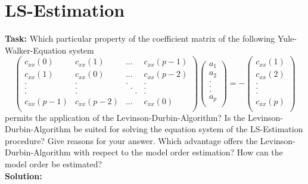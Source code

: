\section{LS-Estimation}
\noindent \textbf{Task:} Which particular property of the coefficient matrix of the following Yule-Walker-Equation system
\begin{equation*}
\begin{pmatrix}
c_{xx}(0) & c_{xx}(1) & ... & c_{xx}(p-1)\\
c_{xx}(1) & c_{xx}(0) & ... & c_{xx}(p-2)\\
. & . &.  &. \\
. & . &\;\;.  &. \\
. & . &\; \; \; \; .  &. \\
c_{xx}(p-1) & c_{xx}(p-2) & ... & c_{xx}(0)\\
\end{pmatrix}
\begin{pmatrix}
a_1\\
a_2\\
. \\
. \\
. \\
a_p \\
\end{pmatrix} = -
\begin{pmatrix}
c_{xx}(1)\\
c_{xx}(2)\\
. \\
. \\
. \\
c_{xx}(p)\\
\end{pmatrix}
\end{equation*}
permits the application of the Levinson-Durbin-Algorithm? Is the Levinson-Durbin-Algorithm be suited for solving the equation system of the LS-Estimation procedure? Give reasons for your answer. Which advantage offers the Levinson-Durbin-Algorithm with respect to the model order estimation? How can the model order be estimated? \\
\noindent \textbf{Solution:}\\